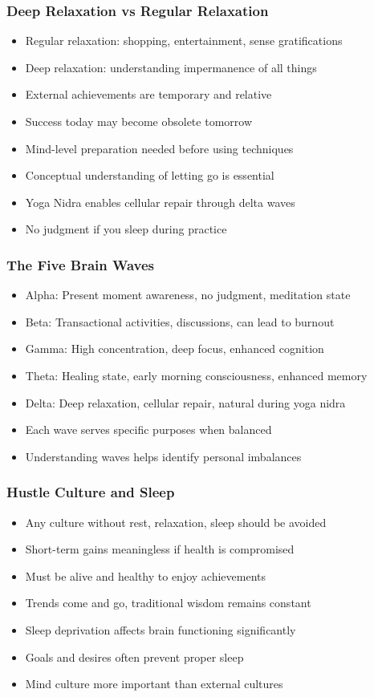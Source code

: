 \begin{frame}[fragile]\frametitle{Deep Relaxation vs Regular Relaxation}
      \begin{itemize}
	\item Regular relaxation: shopping, entertainment, sense gratifications
	\item Deep relaxation: understanding impermanence of all things
	\item External achievements are temporary and relative
	\item Success today may become obsolete tomorrow
	\item Mind-level preparation needed before using techniques
	\item Conceptual understanding of letting go is essential
	\item Yoga Nidra enables cellular repair through delta waves
	\item No judgment if you sleep during practice
	  \end{itemize}
\end{frame}

\begin{frame}[fragile]\frametitle{The Five Brain Waves}
      \begin{itemize}
	\item Alpha: Present moment awareness, no judgment, meditation state
	\item Beta: Transactional activities, discussions, can lead to burnout
	\item Gamma: High concentration, deep focus, enhanced cognition
	\item Theta: Healing state, early morning consciousness, enhanced memory
	\item Delta: Deep relaxation, cellular repair, natural during yoga nidra
	\item Each wave serves specific purposes when balanced
	\item Understanding waves helps identify personal imbalances
	  \end{itemize}
\end{frame}

\begin{frame}[fragile]\frametitle{Hustle Culture and Sleep}
      \begin{itemize}
	\item Any culture without rest, relaxation, sleep should be avoided
	\item Short-term gains meaningless if health is compromised
	\item Must be alive and healthy to enjoy achievements
	\item Trends come and go, traditional wisdom remains constant
	\item Sleep deprivation affects brain functioning significantly
	\item Goals and desires often prevent proper sleep
	\item Mind culture more important than external cultures
	  \end{itemize}
\end{frame}

